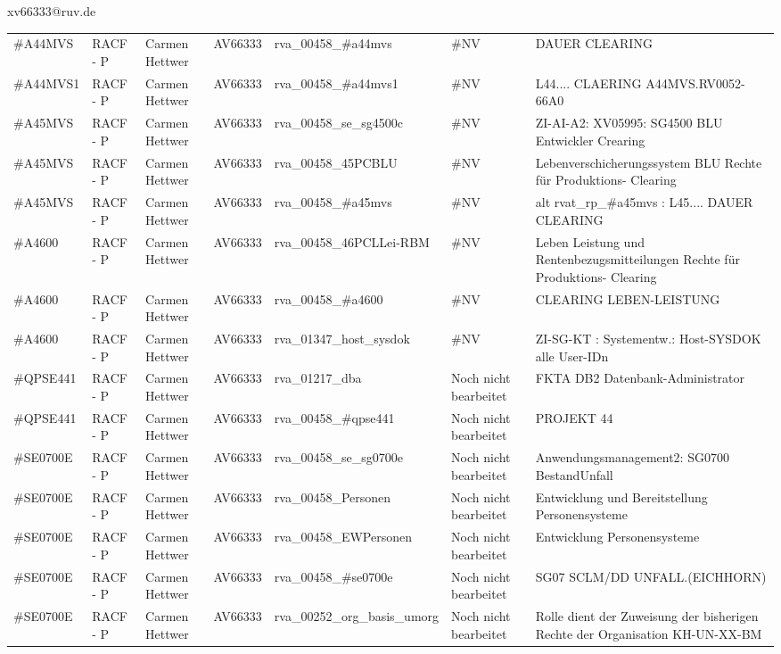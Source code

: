 \documentclass[a4paper,landscape,12pt]{letter}
\begin{document}
\begin{letter}{xv66333@ruv.de\hfill \break}
\begin{tiny}
\begin{longtable}{|p{35mm}|p{15mm}|p{25mm}|p{10mm}|p{40mm}|p{50mm}|p{50mm}|}
\#A44MVS & RACF - P & Carmen Hettwer & AV66333 & rva\_00458\_\#a44mvs & \#NV & DAUER CLEARING \\
\#A44MVS1 & RACF - P & Carmen Hettwer & AV66333 & rva\_00458\_\#a44mvs1 & \#NV & L44.... CLAERING A44MVS.RV0052-66A0 \\
\#A45MVS & RACF - P & Carmen Hettwer & AV66333 & rva\_00458\_se\_sg4500c & \#NV & ZI-AI-A2: XV05995: SG4500 BLU Entwickler Crearing \\
\#A45MVS & RACF - P & Carmen Hettwer & AV66333 & rva\_00458\_45PCBLU & \#NV & Lebenverschicherungssystem BLU Rechte für Produktions- Clearing \\
\#A45MVS & RACF - P & Carmen Hettwer & AV66333 & rva\_00458\_\#a45mvs & \#NV & alt rvat\_rp\_\#a45mvs          : L45.... DAUER CLEARING \\
\#A4600 & RACF - P & Carmen Hettwer & AV66333 & rva\_00458\_46PCLLei-RBM & \#NV & Leben Leistung und Rentenbezugsmitteilungen Rechte für Produktions- Clearing \\
\#A4600 & RACF - P & Carmen Hettwer & AV66333 & rva\_00458\_\#a4600 & \#NV & CLEARING LEBEN-LEISTUNG \\
\#A4600 & RACF - P & Carmen Hettwer & AV66333 & rva\_01347\_host\_sysdok & \#NV & ZI-SG-KT   : Systementw.: Host-SYSDOK alle User-IDn \\
\#QPSE441 & RACF - P & Carmen Hettwer & AV66333 & rva\_01217\_dba & Noch nicht bearbeitet & FKTA DB2 Datenbank-Administrator \\
\#QPSE441 & RACF - P & Carmen Hettwer & AV66333 & rva\_00458\_\#qpse441 & Noch nicht bearbeitet & PROJEKT 44 \\
\#SE0700E & RACF - P & Carmen Hettwer & AV66333 & rva\_00458\_se\_sg0700e & Noch nicht bearbeitet & Anwendungsmanagement2: SG0700 BestandUnfall \\
\#SE0700E & RACF - P & Carmen Hettwer & AV66333 & rva\_00458\_Personen & Noch nicht bearbeitet & Entwicklung und Bereitstellung Personensysteme \\
\#SE0700E & RACF - P & Carmen Hettwer & AV66333 & rva\_00458\_EWPersonen & Noch nicht bearbeitet & Entwicklung Personensysteme \\
\#SE0700E & RACF - P & Carmen Hettwer & AV66333 & rva\_00458\_\#se0700e & Noch nicht bearbeitet & SG07 SCLM/DD UNFALL.(EICHHORN) \\
\#SE0700E & RACF - P & Carmen Hettwer & AV66333 & rva\_00252\_org\_basis\_umorg & Noch nicht bearbeitet & Rolle dient der Zuweisung der bisherigen Rechte der Organisation KH-UN-XX-BM \\


\end{longtable}
\end{tiny}
\end{letter}
\end{document}
